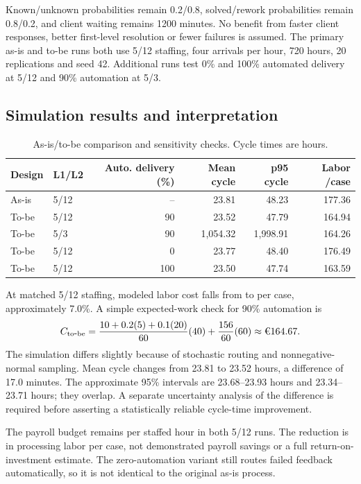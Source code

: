 \documentclass[10pt,a4paper]{article}
\newcommand{\EUR}{\texteuro}
\begin{document}
Known/unknown probabilities remain 0.2/0.8, solved/rework probabilities remain
0.8/0.2, and client waiting remains 1200 minutes. No benefit from faster client
responses, better first-level resolution or fewer failures is assumed.
The primary as-is and to-be runs both use 5/12 staffing, four arrivals per hour,
720 hours, 20 replications and seed 42. Additional runs test 0\% and 100\%
automated delivery at 5/12 and 90\% automation at 5/3.



\subsection{Simulation results and interpretation}
\begin{table}[htbp]
\centering\small
\caption{As-is/to-be comparison and sensitivity checks. Cycle times are hours.}
\label{tab:tobe}
\begin{tabular}{llrrrr}
\toprule
Design & L1/L2 & Auto. delivery (\%) & Mean cycle & p95 cycle & Labor \EUR/case\\
\midrule
As-is & 5/12 & -- & 23.81 & 48.23 & 177.36 \\
To-be & 5/12 & 90 & 23.52 & 47.79 & 164.94 \\
To-be & 5/3 & 90 & 1,054.32 & 1,998.91 & 164.26 \\
To-be & 5/12 & 0 & 23.77 & 48.40 & 176.49 \\
To-be & 5/12 & 100 & 23.50 & 47.74 & 163.59 \\
\bottomrule
\end{tabular}
\end{table}

At matched 5/12 staffing, modeled labor cost falls from \EUR177.36 to \EUR164.94
per case, approximately 7.0\%. A simple expected-work check for 90\% automation is
\[
 C_{\mathrm{to\mbox{-}be}}
 =\frac{10+0.2(5)+0.1(20)}{60}(40)+\frac{156}{60}(60)
 \approx\text{\EUR164.67}.
\]
The simulation differs slightly because of stochastic routing and nonnegative-normal
sampling. Mean cycle changes from 23.81 to 23.52 hours, a difference of 17.0 minutes.
The approximate 95\% intervals are 23.68--23.93 hours and 23.34--23.71 hours;
they overlap. A separate uncertainty analysis of the difference is required before
asserting a statistically reliable cycle-time improvement.

The payroll budget remains \EUR920 per staffed hour in both 5/12 runs. The reduction
is in processing labor per case, not demonstrated payroll savings or a full
return-on-investment estimate. The zero-automation variant still routes failed
feedback automatically, so it is not identical to the original as-is process.
\end{document}

